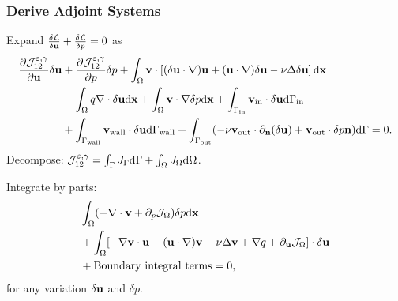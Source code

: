 \documentclass[10pt,xcolor=table,english]{beamer}   %
\begin{document}
\begin{frame}
    \frametitle{Derive Adjoint Systems}
    Expand $\frac{\delta\mathcal{L}}{\delta{\bf u}} + \frac{\delta\mathcal{L}}{\delta p} = 0$ as
    \begin{align*}
    \frac{\partial\mathcal{J}_{12}^{\varepsilon,\gamma}}{\partial{\bf u}}\delta{\bf u} &+ \frac{\partial\mathcal{J}_{12}^{\varepsilon,\gamma}}{\partial p}\delta p + \int_\Omega {\bf v}\cdot\left[(\delta{\bf u}\cdot\nabla){\bf u} + ({\bf u}\cdot\nabla)\delta{\bf u} - \nu\Delta\delta{\bf u}\right]{\rm d}{\bf x} \\
    &- \int_\Omega q\nabla\cdot\delta{\bf u}{\rm d}{\bf x} + \int_\Omega {\bf v}\cdot\nabla\delta p{\rm d}{\bf x} \nonumber + \int_{\Gamma_{\rm in}} {\bf v}_{\rm in}\cdot\delta{\bf u}{\rm d}\Gamma_{\rm in} \\
    &+ \int_{\Gamma_{\rm wall}} {\bf v}_{\rm wall}\cdot\delta{\bf u}{\rm d}\Gamma_{\rm wall} + \int_{\Gamma_{\rm out}} (-\nu{\bf v}_{\rm out}\cdot\partial_{\bf n}(\delta{\bf u}) + {\bf v}_{\rm out}\cdot\delta p{\bf n}){\rm d}\Gamma = 0.
    \end{align*}
    Decompose: $\mathcal{J}_{12}^{\varepsilon,\gamma} = \int_\Gamma J_\Gamma{\rm d}\Gamma + \int_\Omega J_\Omega{\rm d}\Omega$.
    
    Integrate by parts:
    \begin{align*}
    &\int_\Omega (-\nabla\cdot{\bf v} + \partial_p\mathcal{J}_\Omega)\delta p{\rm d}{\bf x} \\
    & + \int_\Omega [-\nabla{\bf v}\cdot{\bf u} - ({\bf u}\cdot\nabla){\bf v} - \nu\Delta{\bf v} + \nabla q + \partial_{\bf u}\mathcal{J}_\Omega]\cdot\delta{\bf u} \nonumber\\
    &+ \mbox{Boundary integral terms} = 0,
    \end{align*}
    for any variation $\delta{\bf u}$ and $\delta p$.
\end{frame}
\end{document}
